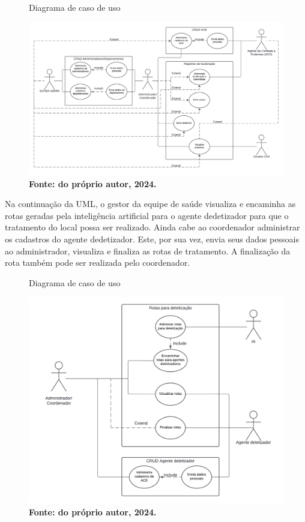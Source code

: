 \begin{figure}[H]
    \centering
    \caption{Diagrama de caso de uso}
    \includegraphics[width=1.0\linewidth]{Illustrations/uml1.png}
    \caption*{\textbf{Fonte: do próprio autor, 2024.}}
\end{figure}

\vspace{12pt}

Na continuação da UML, o gestor da equipe de saúde visualiza e encaminha as rotas geradas pela inteligência artificial para o agente dedetizador para que o tratamento do local possa ser realizado. Ainda cabe ao coordenador administrar os cadastros do agente dedetizador. Este, por sua vez, envia seus dados pessoais ao administrador, visualiza e finaliza as rotas de tratamento. A finalização da rota também pode ser realizada pelo coordenador. 

\begin{figure}[H]
    \centering
    \caption{Diagrama de caso de uso}
    \includegraphics[width=1.0\linewidth]{Illustrations/uml2.png}
    \caption*{\textbf{Fonte: do próprio autor, 2024.}}
\end{figure}

